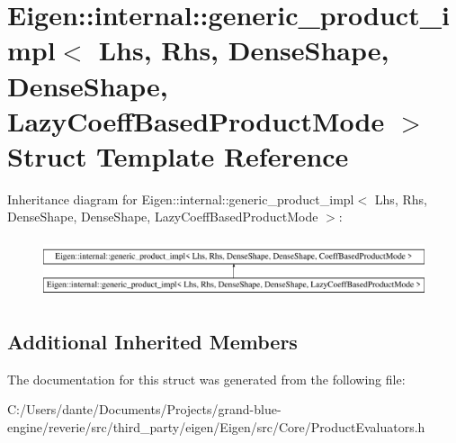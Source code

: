 \hypertarget{struct_eigen_1_1internal_1_1generic__product__impl_3_01_lhs_00_01_rhs_00_01_dense_shape_00_01_dee19e42566a0e6a2965776a41711daa09}{}\section{Eigen\+::internal\+::generic\+\_\+product\+\_\+impl$<$ Lhs, Rhs, Dense\+Shape, Dense\+Shape, Lazy\+Coeff\+Based\+Product\+Mode $>$ Struct Template Reference}
\label{struct_eigen_1_1internal_1_1generic__product__impl_3_01_lhs_00_01_rhs_00_01_dense_shape_00_01_dee19e42566a0e6a2965776a41711daa09}
Inheritance diagram for Eigen\+::internal\+::generic\+\_\+product\+\_\+impl$<$ Lhs, Rhs, Dense\+Shape, Dense\+Shape, Lazy\+Coeff\+Based\+Product\+Mode $>$\+:\begin{figure}[H]
\begin{center}
\leavevmode
\includegraphics[height=1.744548cm]{struct_eigen_1_1internal_1_1generic__product__impl_3_01_lhs_00_01_rhs_00_01_dense_shape_00_01_dee19e42566a0e6a2965776a41711daa09}
\end{center}
\end{figure}
\subsection*{Additional Inherited Members}


The documentation for this struct was generated from the following file\+:\begin{DoxyCompactItemize}
\item 
C\+:/\+Users/dante/\+Documents/\+Projects/grand-\/blue-\/engine/reverie/src/third\+\_\+party/eigen/\+Eigen/src/\+Core/Product\+Evaluators.\+h\end{DoxyCompactItemize}

